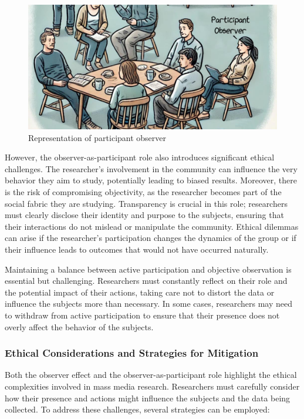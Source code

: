 \documentclass[
]{book}
\begin{document}
\begin{figure}
\centering
\includegraphics{images/fig01f.jpg}
\caption{Representation of participant observer}
\end{figure}

However, the observer-as-participant role also introduces significant ethical challenges. The researcher's involvement in the community can influence the very behavior they aim to study, potentially leading to biased results. Moreover, there is the risk of compromising objectivity, as the researcher becomes part of the social fabric they are studying. Transparency is crucial in this role; researchers must clearly disclose their identity and purpose to the subjects, ensuring that their interactions do not mislead or manipulate the community. Ethical dilemmas can arise if the researcher's participation changes the dynamics of the group or if their influence leads to outcomes that would not have occurred naturally.

Maintaining a balance between active participation and objective observation is essential but challenging. Researchers must constantly reflect on their role and the potential impact of their actions, taking care not to distort the data or influence the subjects more than necessary. In some cases, researchers may need to withdraw from active participation to ensure that their presence does not overly affect the behavior of the subjects.

\subsubsection*{Ethical Considerations and Strategies for Mitigation}\label{ethical-considerations-and-strategies-for-mitigation}

Both the observer effect and the observer-as-participant role highlight the ethical complexities involved in mass media research. Researchers must carefully consider how their presence and actions might influence the subjects and the data being collected. To address these challenges, several strategies can be employed:
\end{document}

